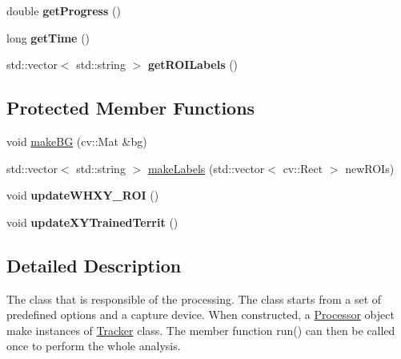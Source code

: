 \begin{DoxyCompactItemize}
\item 
\hypertarget{classProcessor_ae0e9382de99b0f1fa24d324ff41507b4}{double {\bfseries get\-Progress} ()}\label{classProcessor_ae0e9382de99b0f1fa24d324ff41507b4}

\item 
\hypertarget{classProcessor_a5360848bc35c0858c57cb998602e2f21}{long {\bfseries get\-Time} ()}\label{classProcessor_a5360848bc35c0858c57cb998602e2f21}

\item 
\hypertarget{classProcessor_adbd497202f3826f40aaf0a96d26e49ed}{std\-::vector$<$ std\-::string $>$ {\bfseries get\-R\-O\-I\-Labels} ()}\label{classProcessor_adbd497202f3826f40aaf0a96d26e49ed}

\end{DoxyCompactItemize}
\subsection*{Protected Member Functions}
\begin{DoxyCompactItemize}
\item 
void \hyperlink{classProcessor_a9c6b50097b0c6557977ac16c3e175f81}{make\-B\-G} (cv\-::\-Mat \&bg)
\item 
std\-::vector$<$ std\-::string $>$ \hyperlink{classProcessor_aabca68f9773e2ca862b5e512da3947cb}{make\-Labels} (std\-::vector$<$ cv\-::\-Rect $>$ new\-R\-O\-Is)
\item 
\hypertarget{classProcessor_a0cfbd1d9124b56ac7119ecd7db4ccf8c}{void {\bfseries update\-W\-H\-X\-Y\-\_\-\-R\-O\-I} ()}\label{classProcessor_a0cfbd1d9124b56ac7119ecd7db4ccf8c}

\item 
\hypertarget{classProcessor_a1bf0869716355640f3729a65101eeaaa}{void {\bfseries update\-X\-Y\-Trained\-Territ} ()}\label{classProcessor_a1bf0869716355640f3729a65101eeaaa}

\end{DoxyCompactItemize}


\subsection{Detailed Description}
The class that is responsible of the processing. The class starts from a set of predefined options and a capture device. When constructed, a \hyperlink{classProcessor}{Processor} object make instances of \hyperlink{classTracker}{Tracker} class. The member function run() can then be called once to perform the whole analysis. 

